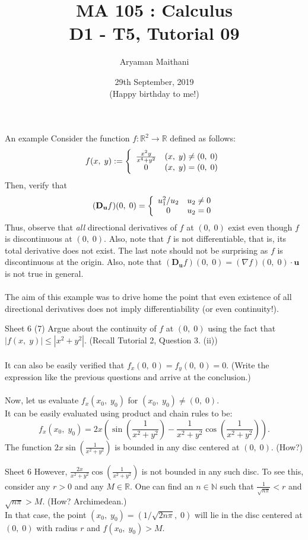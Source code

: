 \documentclass[handout, aspectratio=169]{beamer}
\title{MA 105 : Calculus\\ D1 - T5, Tutorial 09}  %
\author{Aryaman Maithani}
\date[29-09-2019]{29th September, 2019\\ \tiny (Happy birthday to me!)}               %
\institute[IITB]{IIT Bombay}
\begin{document}
\begin{frame}
	\titlepage
\end{frame}
\begin{frame}{An example}
	Consider the function $f:\mathbb{R}^2 \to \mathbb{R}$ defined as follows:
	\[f(x,\;y) := \left\{
	\begin{array}{c c}
		\frac{x^2y}{x^4 + y^2} & (x,\; y) \neq (0,\;0)\\
		0 & (x,\;y) = (0,\;0)
	\end{array}
	\right.\]
	Then, verify that
	\[(\mathbf{D_{u}}f)(0,\;0) = \left\{
	\begin{array}{c c}
		u_1^2/u_2 & u_2 \neq 0\\
		0 & u_2 = 0
	\end{array}
	\right.\]
	Thus, observe that \emph{all} directional derivatives of $f$ at $(0,\;0)$ exist even though $f$ is discontinuous at $(0,\;0).$ Also, note that $f$ is not differentiable, that is, its total derivative does not exist. The last note should not be surprising as $f$ is discontinuous at the origin. Also, note that $(\mathbf{D_u}f)(0,\;0) = (\nabla f)(0,\;0)\cdot\mathbf{u}$ is not true in general.\\~\\
	The aim of this example was to drive home the point that even existence of all directional derivatives does not imply differentiability (or even continuity!).
\end{frame}
\begin{frame}{Sheet 6}
	(7) Argue about the continuity of $f$ at $(0,\;0)$ using the fact that $|f(x,\;y)| \le |x^2 + y^2|.$ (Recall Tutorial 2, Question 3. (ii))\\~\\
	It can also be easily verified that $f_x(0,\;0) = f_y(0,\;0) = 0.$ (Write the expression like the previous questions and arrive at the conclusion.)\\~\\
	Now, let us evaluate $f_x(x_0,\;y_0)$ for $(x_0,\;y_0) \neq (0,\;0).$\\
	It can be easily evaluated using product and chain rules to be:
	\[f_x(x_0,\;y_0) = 2x\left(\sin\left(\frac{1}{x^2 + y^2}\right) - \frac{1}{x^2 + y^2}\cos\left(\frac{1}{x^2 + y^2}\right)\right).\]
	The function $\displaystyle2x\sin\left(\frac{1}{x^2 + y^2}\right)$ is bounded in any disc centered at $(0,\;0).$ \hfill (How?)\\
\end{frame}
	
\begin{frame}{Sheet 6}
	However, $\displaystyle\frac{2x}{x^2 + y^2}\cos\left(\frac{1}{x^2 + y^2}\right)$ is not bounded in any such disc. To see this, consider any $r > 0$ and any $M \in \mathbb{R}.$ One can find an $n \in \mathbb{N}$ such that $\frac{1}{\sqrt{n\pi}} < r$ and $\sqrt{n\pi} > M.$ \hfill (How? Archimedean.)\\
	In that case, the point $(x_0,\;y_0) = (1/\sqrt{2n\pi},\;0)$ will lie in the disc centered at $(0,\;0)$ with radius $r$ and $f(x_0,\;y_0) > M.$
\end{frame}
\end{document}
